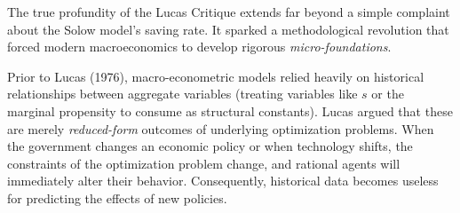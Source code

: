 \begin{figure}[htbp]
\begin{minipage}{0.48\textwidth}
    \end{minipage}
\end{figure}


The true profundity of the Lucas Critique extends far beyond a simple complaint about the Solow model's saving rate. It sparked a methodological revolution that forced modern macroeconomics to develop rigorous \textit{micro-foundations}. 

Prior to Lucas (1976), macro-econometric models relied heavily on historical relationships between aggregate variables (treating variables like $s$ or the marginal propensity to consume as structural constants). Lucas argued that these are merely \textit{reduced-form} outcomes of underlying optimization problems. When the government changes an economic policy or when technology shifts, the constraints of the optimization problem change, and rational agents will immediately alter their behavior. Consequently, historical data becomes useless for predicting the effects of new policies.


